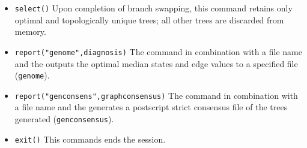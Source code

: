 \begin{itemize}
\item \texttt{select()} Upon completion of branch swapping, this command retains only optimal and topologically unique trees; all other trees are discarded from memory. 
\item \texttt{report("genome",diagnosis)}  The  command in combination with a file name and the  outputs the optimal median states and edge values to a specified file (\texttt{genome}). 
\item \texttt{report("genconsens",graphconsensus)}  The  command in combination with a file name and the  generates a postscript strict consensus file of the trees generated (\texttt{genconsensus}). 
\item \texttt{exit()} This commands ends the \poy session.
\end{itemize}